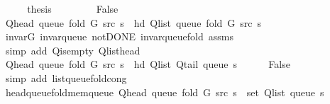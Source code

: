 \begin{isabellebody}
\ \ \isamarkupfalse%
\ \isamarkupfalse%
\ {\isacharquery}{\kern0pt}thesis\isanewline
\ \ \ \ \isacommand{{\isachardot}{\kern0pt}}\isamarkupfalse%
\isanewline
{}\isamarkupfalse%
\isanewline
\ \ \isamarkupfalse%
\ False\isanewline
\ \ \isamarkupfalse%
\ {\isachardoublequoteopen}Q{\isacharunderscore}{\kern0pt}head\ {\isacharparenleft}{\kern0pt}queue\ {\isacharparenleft}{\kern0pt}fold\ G\ src\ s{\isacharparenright}{\kern0pt}{\isacharparenright}{\kern0pt}\ {\isacharequal}{\kern0pt}\ hd\ {\isacharparenleft}{\kern0pt}Q{\isacharunderscore}{\kern0pt}list\ {\isacharparenleft}{\kern0pt}queue\ {\isacharparenleft}{\kern0pt}fold\ G\ src\ s{\isacharparenright}{\kern0pt}{\isacharparenright}{\kern0pt}{\isacharparenright}{\kern0pt}{\isachardoublequoteclose}\isanewline
\ \ \ \ \isamarkupfalse%
\ invar{\isacharunderscore}{\kern0pt}G\ invar{\isacharunderscore}{\kern0pt}queue\ not{\isacharunderscore}{\kern0pt}DONE\ invar{\isacharunderscore}{\kern0pt}queue{\isacharunderscore}{\kern0pt}fold{\isacharunderscore}{\kern0pt}{}\ assms\isanewline
\ \ \ \ \isamarkupfalse%
\ {\isacharparenleft}{\kern0pt}simp\ add{\isacharcolon}{\kern0pt}\ Q{\isachardot}{\kern0pt}is{\isacharunderscore}{\kern0pt}empty\ Q{\isachardot}{\kern0pt}list{\isacharunderscore}{\kern0pt}head{\isacharparenright}{\kern0pt}\isanewline
\ \ \isamarkupfalse%
\ {\isachardoublequoteopen}Q{\isacharunderscore}{\kern0pt}head\ {\isacharparenleft}{\kern0pt}queue\ {\isacharparenleft}{\kern0pt}fold\ G\ src\ s{\isacharparenright}{\kern0pt}{\isacharparenright}{\kern0pt}\ {\isacharequal}{\kern0pt}\ hd\ {\isacharparenleft}{\kern0pt}Q{\isacharunderscore}{\kern0pt}list\ {\isacharparenleft}{\kern0pt}Q{\isacharunderscore}{\kern0pt}tail\ {\isacharparenleft}{\kern0pt}queue\ s{\isacharparenright}{\kern0pt}{\isacharparenright}{\kern0pt}{\isacharparenright}{\kern0pt}{\isachardoublequoteclose}\isanewline
\ \ \ \ \isamarkupfalse%
\ False\isanewline
\ \ \ \ \isamarkupfalse%
\ {\isacharparenleft}{\kern0pt}simp\ add{\isacharcolon}{\kern0pt}\ list{\isacharunderscore}{\kern0pt}queue{\isacharunderscore}{\kern0pt}fold{\isacharunderscore}{\kern0pt}cong{\isacharparenright}{\kern0pt}\isanewline
\ \ \isamarkupfalse%
\ head{\isacharunderscore}{\kern0pt}queue{\isacharunderscore}{\kern0pt}fold{\isacharunderscore}{\kern0pt}mem{\isacharunderscore}{\kern0pt}queue{\isacharcolon}{\kern0pt}\ {\isachardoublequoteopen}Q{\isacharunderscore}{\kern0pt}head\ {\isacharparenleft}{\kern0pt}queue\ {\isacharparenleft}{\kern0pt}fold\ G\ src\ s{\isacharparenright}{\kern0pt}{\isacharparenright}{\kern0pt}\ {\isasymin}\ set\ {\isacharparenleft}{\kern0pt}Q{\isacharunderscore}{\kern0pt}list\ {\isacharparenleft}{\kern0pt}queue\ s{\isacharparenright}{\kern0pt}{\isacharparenright}{\kern0pt}{\isachardoublequoteclose}\isanewline

\end{isabellebody}
